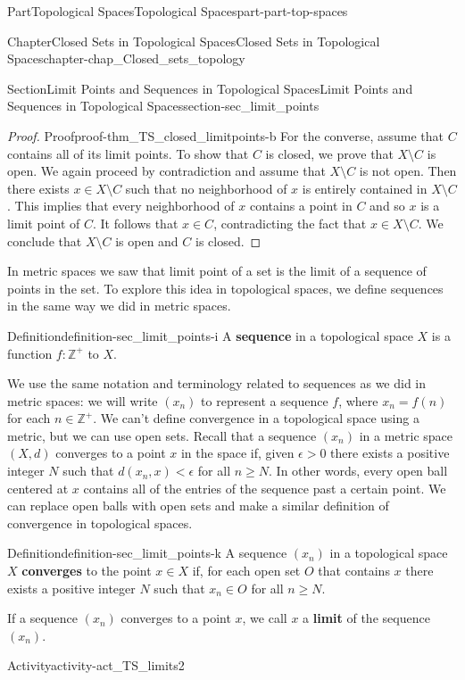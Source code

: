 \documentclass[oneside,10pt,]{book}
\newcommand{\terminology}[1]{\textbf{#1}}
\numberwithin{equation}{chapter}
\newcommand{\Z}{\mathbb{Z}}
\newcommand{\lt}{<}
\newcommand{\gt}{>}
\begin{document}
\begin{partptx}{Part}{Topological Spaces}{}{Topological Spaces}{}{}{part-part-top-spaces}
\begin{chapterptx}{Chapter}{Closed Sets in Topological Spaces}{}{Closed Sets in Topological Spaces}{}{}{chapter-chap_Closed_sets_topology}
\begin{sectionptx}{Section}{Limit Points and Sequences in Topological Spaces}{}{Limit Points and Sequences in Topological Spaces}{}{}{section-sec_limit_points}
\begin{proof}{Proof}{}{proof-thm_TS_closed_limitpoints-b}
For the converse, assume that \(C\) contains all of its limit points. To show that \(C\) is closed, we prove that \(X \setminus C\) is open. We again proceed by contradiction and assume that \(X \setminus C\) is not open. Then there exists \(x \in X \setminus C\) such that no neighborhood of \(x\) is entirely contained in \(X \setminus C\). This implies that every neighborhood of \(x\) contains a point in \(C\) and so \(x\) is a limit point of \(C\). It follows that \(x \in C\), contradicting the fact that \(x \in X \setminus C\). We conclude that \(X \setminus C\) is open and \(C\) is closed.%
\end{proof}
In metric spaces we saw that limit point of a set is the limit of a sequence of points in the set. To explore this idea in topological spaces, we define sequences in the same way we did in metric spaces.%
\begin{definition}{Definition}{}{definition-sec_limit_points-i}%
%
A \terminology{sequence} in a topological space \(X\) is a function \(f: \Z^+\) to \(X\).%
\end{definition}
We use the same notation and terminology related to sequences as we did in metric spaces: we will write \((x_n)\) to represent a sequence \(f\), where \(x_n = f(n)\) for each \(n \in \Z^+\). We can't define convergence in a topological space using a metric, but we can use open sets. Recall that a sequence \((x_n)\) in a metric space \((X,d)\) converges to a point \(x\) in the space if, given \(\epsilon \gt 0\) there exists a positive integer \(N\) such that \(d(x_n,x) \lt \epsilon\) for all \(n \geq N\). In other words, every open ball centered at \(x\) contains all of the entries of the sequence past a certain point. We can replace open balls with open sets and make a similar definition of convergence in topological spaces.%
\begin{definition}{Definition}{}{definition-sec_limit_points-k}%
%
A sequence \((x_n)\) in a topological space \(X\) \terminology{converges} to the point \(x \in X\) if, for each open set \(O\) that contains \(x\) there exists a positive integer \(N\) such that \(x_n \in O\) for all \(n \geq N\).%
\end{definition}
 If a sequence \((x_n)\) converges to a point \(x\), we call \(x\) a \terminology{limit} of the sequence \((x_n)\).%
\begin{activity}{Activity}{}{activity-act_TS_limits2}%

\end{activity}
\end{sectionptx}
\end{chapterptx}
\end{partptx}
\end{document}
